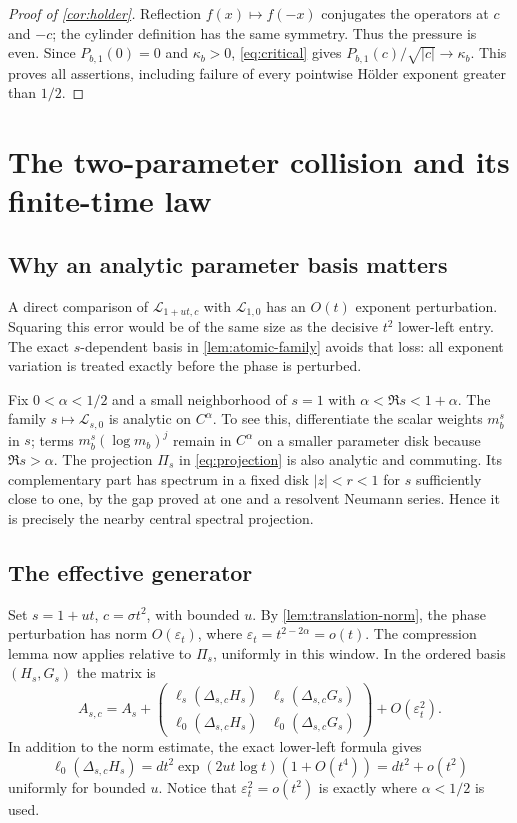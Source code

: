 \documentclass[11pt,a4paper]{article}
\numberwithin{equation}{section}
\theoremstyle{definition}
\theoremstyle{remark}
\newcommand{\Lop}{\mathcal L}
\newcommand{\Proj}{\Pi}
\begin{document}
\begin{proof}[Proof of \cref{cor:holder}]
Reflection $f(x)\mapsto f(-x)$ conjugates the operators at $c$ and $-c$;
the cylinder definition has the same symmetry. Thus the pressure is
even. Since $P_{b,1}(0)=0$ and $\kappa_b>0$, \cref{eq:critical} gives
$P_{b,1}(c)/\sqrt{|c|}\to\kappa_b$. This proves all assertions,
including failure of every pointwise H\"older exponent greater than
$1/2$.
\end{proof}

\section{The two-parameter collision and its finite-time law}
\label{sec:crossover}

\subsection{Why an analytic parameter basis matters}
A direct comparison of $\Lop_{1+ut,c}$ with $\Lop_{1,0}$ has an
$O(t)$ exponent perturbation. Squaring this error would be of the same
size as the decisive $t^2$ lower-left entry. The exact $s$-dependent
basis in \cref{lem:atomic-family} avoids that loss: all exponent
variation is treated exactly before the phase is perturbed.

Fix $0<\alpha<1/2$ and a small neighborhood of $s=1$ with
$\alpha<\Re s<1+\alpha$. The family $s\mapsto\Lop_{s,0}$ is analytic
on $C^\alpha$. To see this, differentiate the scalar weights
$m_b^s$ in $s$; terms $m_b^s(\log m_b)^j$ remain in $C^\alpha$ on a
smaller parameter disk because $\Re s>\alpha$.
The projection $\Proj_s$ in \cref{eq:projection} is also analytic and
commuting. Its complementary part has spectrum in a fixed disk
$|z|<r<1$ for $s$ sufficiently close to one, by the gap proved at one
and a resolvent Neumann series. Hence it is precisely the nearby
central spectral projection.

\subsection{The effective generator}
Set $s=1+ut$, $c=\sigma t^2$, with bounded $u$.
By \cref{lem:translation-norm}, the phase perturbation has norm
$O(\varepsilon_t)$, where
$\varepsilon_t=t^{2-2\alpha}=o(t)$.
The compression lemma now applies relative to $\Proj_s$, uniformly in
this window. In the ordered basis $(H_s,G_s)$ the matrix is
\begin{equation}
 A_{s,c}=A_s+
 \begin{pmatrix}
 \ell_s(\Delta_{s,c}H_s)&\ell_s(\Delta_{s,c}G_s)\\
 \ell_0(\Delta_{s,c}H_s)&\ell_0(\Delta_{s,c}G_s)
 \end{pmatrix}+O(\varepsilon_t^2).
 \label{eq:window-matrix}
\end{equation}
In addition to the norm estimate, the exact lower-left formula gives
\begin{equation}
 \ell_0(\Delta_{s,c}H_s)
 =d t^2\exp(2ut\log t)(1+O(t^4))=dt^2+o(t^2)
 \label{eq:window-lower-left}
\end{equation}
uniformly for bounded $u$. Notice that
$\varepsilon_t^2=o(t^2)$ is exactly where $\alpha<1/2$ is used.
\end{document}
